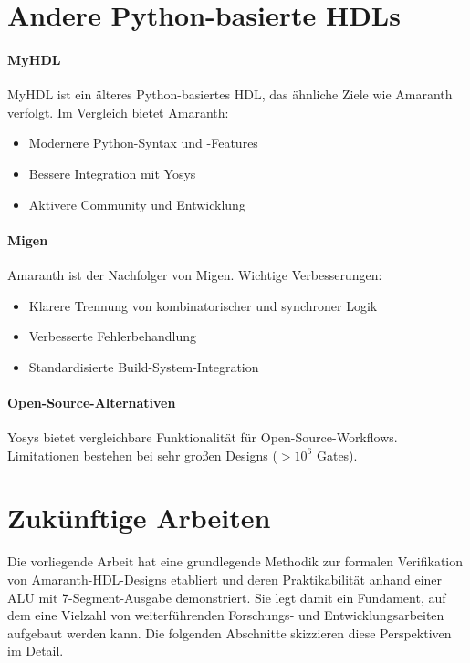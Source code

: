 ﻿\documentclass[12pt,a4paper]{report}
\begin{document}
\section{Andere Python-basierte HDLs}

\paragraph{MyHDL}
MyHDL \cite{myhdl2024} ist ein älteres Python-basiertes HDL, das ähnliche Ziele wie Amaranth verfolgt. Im Vergleich bietet Amaranth:
\begin{itemize}
	\item Modernere Python-Syntax und -Features
	\item Bessere Integration mit Yosys
	\item Aktivere Community und Entwicklung
\end{itemize}

\paragraph{Migen}
Amaranth ist der Nachfolger von Migen. Wichtige Verbesserungen:
\begin{itemize}
	\item Klarere Trennung von kombinatorischer und synchroner Logik
	\item Verbesserte Fehlerbehandlung
	\item Standardisierte Build-System-Integration
\end{itemize}

\paragraph{Open-Source-Alternativen}
Yosys bietet vergleichbare Funktionalität für Open-Source-Workflows. Limitationen bestehen bei sehr großen Designs ($> 10^6$ Gates).

\section{Zukünftige Arbeiten}

Die vorliegende Arbeit hat eine grundlegende Methodik zur formalen Verifikation von
Amaranth-HDL-Designs etabliert und deren Praktikabilität anhand einer ALU mit
7-Segment-Ausgabe demonstriert. Sie legt damit ein Fundament, auf dem eine Vielzahl von
weiterführenden Forschungs- und Entwicklungsarbeiten aufgebaut werden kann. Die
folgenden Abschnitte skizzieren diese Perspektiven im Detail.
\end{document}
